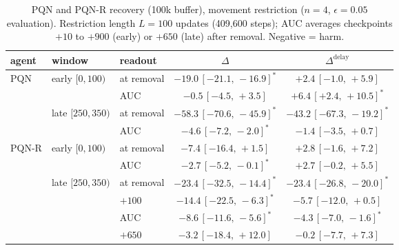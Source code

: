 \documentclass[10pt]{article} %
\newcommand{\sig}{^{\ast}}
\newcommand{\ci}[2]{\,[#1,\,#2]}
\newcommand{\Ddel}{\Delta^{\mathrm{delay}}}
\begin{document}
\begin{table}[t]
\centering
\caption{PQN and PQN-R recovery (100k buffer), movement restriction ($n=4$, $\epsilon=0.05$ evaluation). Restriction length $L=100$ updates (409{,}600 steps); AUC averages checkpoints $+10$ to $+900$ (early) or $+650$ (late) after removal. Negative = harm.}
\label{tab:pqn_recovery}
\small
\begin{tabular}{lllcc}
\toprule
agent & window & readout & $\Delta$ & $\Ddel$ \\
\midrule
PQN   & early $[0,100)$   & at removal & $-19.0\ci{-21.1}{-16.9}\sig$ & $+2.4\ci{-1.0}{+5.9}$ \\
      &                   & AUC        & $-0.5\ci{-4.5}{+3.5}$        & $+6.4\ci{+2.4}{+10.5}\sig$ \\
      & late $[250,350)$  & at removal & $-58.3\ci{-70.6}{-45.9}\sig$ & $-43.2\ci{-67.3}{-19.2}\sig$ \\
      &                   & AUC        & $-4.6\ci{-7.2}{-2.0}\sig$    & $-1.4\ci{-3.5}{+0.7}$ \\
\midrule
PQN-R & early $[0,100)$   & at removal & $-7.4\ci{-16.4}{+1.5}$       & $+2.8\ci{-1.6}{+7.2}$ \\
      &                   & AUC        & $-2.7\ci{-5.2}{-0.1}\sig$    & $+2.7\ci{-0.2}{+5.5}$ \\
      & late $[250,350)$  & at removal & $-23.4\ci{-32.5}{-14.4}\sig$ & $-23.4\ci{-26.8}{-20.0}\sig$ \\
      &                   & $+100$     & $-14.4\ci{-22.5}{-6.3}\sig$  & $-5.7\ci{-12.0}{+0.5}$ \\
      &                   & AUC        & $-8.6\ci{-11.6}{-5.6}\sig$   & $-4.3\ci{-7.0}{-1.6}\sig$ \\
      &                   & $+650$     & $-3.2\ci{-18.4}{+12.0}$      & $-0.2\ci{-7.7}{+7.3}$ \\
\bottomrule
\end{tabular}
\end{table}
\end{document}
